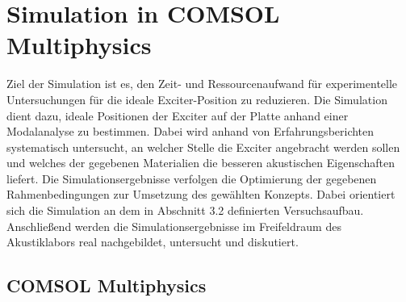 \clearpage

\section{Simulation in COMSOL Multiphysics}

Ziel der Simulation ist es, den Zeit- und Ressourcenaufwand für experimentelle Untersuchungen für die ideale Exciter-Position zu reduzieren. Die Simulation dient dazu, ideale Positionen der Exciter auf der Platte anhand einer Modalanalyse zu bestimmen. 
Dabei wird anhand von Erfahrungsberichten systematisch untersucht, an welcher Stelle die Exciter angebracht werden sollen und welches der gegebenen Materialien die besseren akustischen Eigenschaften liefert. Die Simulationsergebnisse verfolgen die Optimierung der gegebenen Rahmenbedingungen zur Umsetzung des gewählten Konzepts. Dabei orientiert sich die Simulation an dem in Abschnitt 3.2 definierten Versuchsaufbau. Anschließend werden die Simulationsergebnisse im Freifeldraum des Akustiklabors real nachgebildet, untersucht und diskutiert.  



\subsection{COMSOL Multiphysics}

